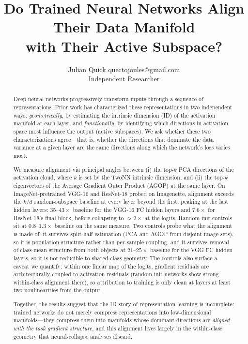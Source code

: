 \documentclass{article}
\title{Do Trained Neural Networks Align Their Data Manifold\\
       with Their Active Subspace?}
\author{\name Julian Quick \email quectojoules@gmail.com \\
        \addr Independent Researcher}
\begin{document}
\maketitle

\begin{abstract}
Deep neural networks progressively transform inputs through a sequence of
representations.  Prior work has characterized these representations in two
independent ways: \emph{geometrically}, by estimating the intrinsic dimension
(ID) of the activation manifold at each layer, and \emph{functionally}, by
identifying which directions in activation space most influence the output
(active subspaces).  We ask whether these two characterizations agree---that
is, whether the directions that dominate the data variance at a given layer
are the same directions along which the network's loss varies most.

We measure alignment via principal angles between (i) the top-$k$ PCA
directions of the activation cloud, where $k$ is set by the TwoNN intrinsic
dimension, and (ii) the top-$k$ eigenvectors of the Average Gradient Outer
Product (AGOP) at the same layer.  On ImageNet-pretrained VGG-16 and
ResNet-18 probed on Imagenette, alignment exceeds the $k/d$ random-subspace
baseline at every layer beyond the first, peaking at the last hidden layers:
$35$--$43\times$ baseline for the VGG-16 FC hidden layers and $7.6\times$
for ResNet-18's final block, before collapsing to ${\approx}2\times$ at the
logits.  Random-init controls sit at $0.8$--$1.3\times$ baseline on the same
measure.  Two controls probe what the alignment is made of: it survives
split-half estimation (PCA and AGOP from disjoint image sets), so it is
population structure rather than per-sample coupling, and it survives
removal of class-mean structure from both objects at $21$--$25\times$
baseline for the VGG FC hidden layers, so it is not reducible to shared
class geometry.  The controls also surface a caveat we quantify: within one
linear map of the logits, gradient residuals are architecturally coupled to
activation residuals (random-init networks show strong within-class
alignment there), so attribution to training is only clean at layers at
least two nonlinearities from the output.

Together, the results suggest that the ID story of representation learning
is incomplete: trained networks do not merely compress representations into
low-dimensional manifolds---they compress them into manifolds whose dominant
directions are \emph{aligned with the task gradient structure}, and this
alignment lives largely in the within-class geometry that neural-collapse
analyses discard.
\end{abstract}
\end{document}
